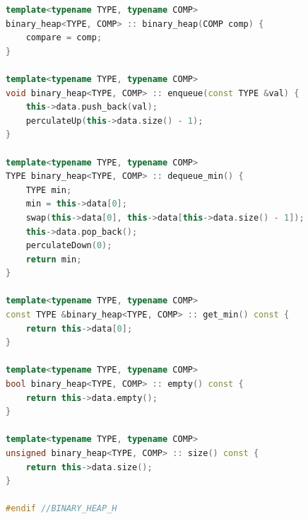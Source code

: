\documentclass[a4paper]{article}
\begin{document}
\begin{lstlisting}[language=C++]
template<typename TYPE, typename COMP>
binary_heap<TYPE, COMP> :: binary_heap(COMP comp) {
    compare = comp;
}

template<typename TYPE, typename COMP>
void binary_heap<TYPE, COMP> :: enqueue(const TYPE &val) {
	this->data.push_back(val);
	perculateUp(this->data.size() - 1);
}

template<typename TYPE, typename COMP>
TYPE binary_heap<TYPE, COMP> :: dequeue_min() {
	TYPE min;
	min = this->data[0];
	swap(this->data[0], this->data[this->data.size() - 1]);
	this->data.pop_back();
	perculateDown(0);
	return min;
}

template<typename TYPE, typename COMP>
const TYPE &binary_heap<TYPE, COMP> :: get_min() const {
	return this->data[0];
}

template<typename TYPE, typename COMP>
bool binary_heap<TYPE, COMP> :: empty() const {
	return this->data.empty();
}

template<typename TYPE, typename COMP>
unsigned binary_heap<TYPE, COMP> :: size() const { 
	return this->data.size();
}

#endif //BINARY_HEAP_H
\end{lstlisting}
\end{document}
